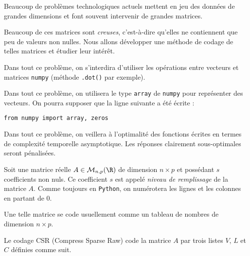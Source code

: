 \exer{}
\setcounter{numques}{0}

Beaucoup de problèmes technologiques actuels mettent en jeu des données de grandes dimensions et font souvent intervenir de grandes matrices.

Beaucoup de ces matrices sont \emph{creuses}, c'est-à-dire qu'elles ne contiennent que peu de valeurs non nulles. Nous allons développer une méthode de codage de telles matrices et étudier leur intérêt. 

Dans tout ce problème, on s'interdira d'utiliser les opérations entre vecteurs et matrices \texttt{numpy} (méthode \texttt{.dot()} par exemple). 

Dans tout ce problème, on utilisera le type \texttt{array} de \texttt{numpy} pour représenter des vecteurs. 
On pourra supposer que la ligne suivante a été écrite : 
\begin{lstlisting}
from numpy import array, zeros
\end{lstlisting}

Dans tout ce problème, on veillera à l'optimalité des fonctions écrites en termes de complexité temporelle asymptotique. Les réponses clairement sous-optimales seront pénalisées. 

\bigskip{}

Soit une matrice réelle $A \in \mathcal{M}_{n,p}(\R)$ de dimension $n \times p$ et possédant $s$ coefficients non nuls. Ce coefficient $s$ est appelé \emph{niveau de remplissage} de la matrice $A$. 
Comme toujours en \texttt{Python}{}, on numérotera les lignes et les colonnes en partant de $0$. 

Une telle matrice se code usuellement comme un tableau de nombres de dimension $n\times p$. 

Le codage CSR (Compress Sparse Raw) code la matrice $A$ par trois listes $V$, $L$ et $C$ définies comme suit.

